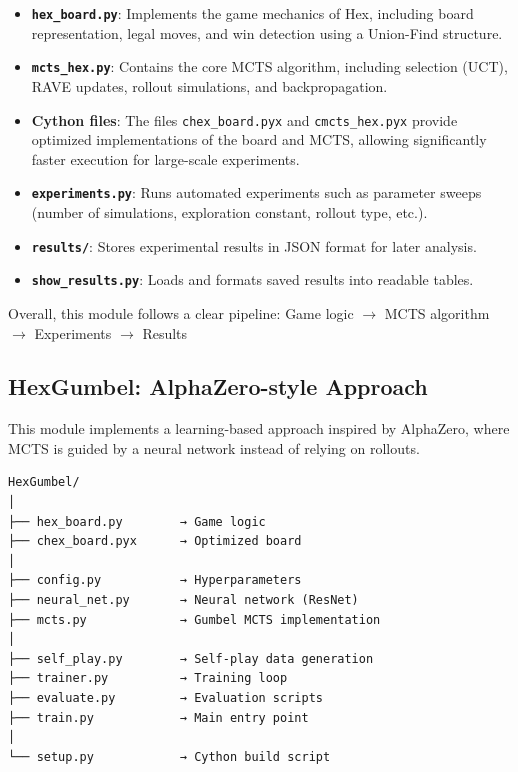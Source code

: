 \documentclass[11pt,a4paper]{article}
\begin{document}
\begin{itemize}
    \item \textbf{\texttt{hex\_board.py}}: Implements the game mechanics of Hex, including board representation, legal moves, and win detection using a Union-Find structure.
    
    \item \textbf{\texttt{mcts\_hex.py}}: Contains the core MCTS algorithm, including selection (UCT), RAVE updates, rollout simulations, and backpropagation.
    
    \item \textbf{Cython files}: The files \texttt{chex\_board.pyx} and \texttt{cmcts\_hex.pyx} provide optimized implementations of the board and MCTS, allowing significantly faster execution for large-scale experiments.
    
    \item \textbf{\texttt{experiments.py}}: Runs automated experiments such as parameter sweeps (number of simulations, exploration constant, rollout type, etc.).
    
    \item \textbf{\texttt{results/}}: Stores experimental results in JSON format for later analysis.
    
    \item \textbf{\texttt{show\_results.py}}: Loads and formats saved results into readable tables.
\end{itemize}

Overall, this module follows a clear pipeline:
Game logic $\rightarrow$ MCTS algorithm $\rightarrow$ Experiments $\rightarrow$ Results

\subsection{HexGumbel: AlphaZero-style Approach}

This module implements a learning-based approach inspired by AlphaZero, where MCTS is guided by a neural network instead of relying on rollouts.

\begin{verbatim}
HexGumbel/
│
├── hex_board.py        → Game logic
├── chex_board.pyx      → Optimized board
│
├── config.py           → Hyperparameters
├── neural_net.py       → Neural network (ResNet)
├── mcts.py             → Gumbel MCTS implementation
│
├── self_play.py        → Self-play data generation
├── trainer.py          → Training loop
├── evaluate.py         → Evaluation scripts
├── train.py            → Main entry point
│
└── setup.py            → Cython build script
\end{verbatim}
\end{document}
